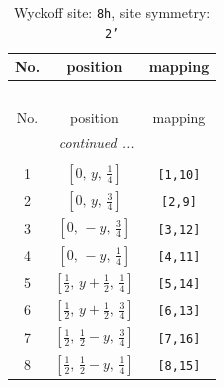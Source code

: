 \documentclass[fleqn,8pt]{jsarticle}
\begin{document}
\begin{longtable}{ccc}
\caption{Wyckoff site: {\tt 8h}, site symmetry: {\tt 2'}}
 \\
 \hline \hline
No. & position & mapping \\ \hline \endfirsthead

\multicolumn{2}{l}{\tablename\ \thetable{}} \\
 \hline \hline
No. & position & mapping \\ \hline \endhead

 \hline \hline
\multicolumn{2}{r}{\footnotesize\it continued ...} \\ \endfoot

 \hline \hline
\multicolumn{2}{r}{} \\ \endlastfoot

1 & $\left[ 0,\, y,\, \frac{1}{4} \right]$ & {\tt [1,10]} \\ \hline
2 & $\left[ 0,\, y,\, \frac{3}{4} \right]$ & {\tt [2,9]} \\ \hline
3 & $\left[ 0,\, - y,\, \frac{3}{4} \right]$ & {\tt [3,12]} \\ \hline
4 & $\left[ 0,\, - y,\, \frac{1}{4} \right]$ & {\tt [4,11]} \\ \hline
5 & $\left[ \frac{1}{2},\, y + \frac{1}{2},\, \frac{1}{4} \right]$ & {\tt [5,14]} \\ \hline
6 & $\left[ \frac{1}{2},\, y + \frac{1}{2},\, \frac{3}{4} \right]$ & {\tt [6,13]} \\ \hline
7 & $\left[ \frac{1}{2},\, \frac{1}{2} - y,\, \frac{3}{4} \right]$ & {\tt [7,16]} \\ \hline
8 & $\left[ \frac{1}{2},\, \frac{1}{2} - y,\, \frac{1}{4} \right]$ & {\tt [8,15]} \\
\end{longtable}
\renewcommand{\arraystretch}{1.2}
\end{document}
